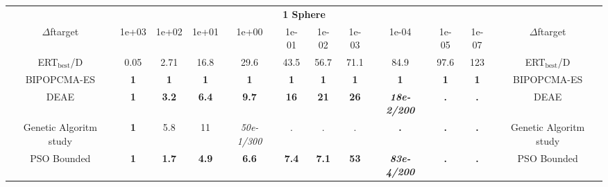 \begin{tabular}{cccccccccccc}
 & \multicolumn{10}{c}{{\normalsize \textbf{1 Sphere}}}\\
$\Delta$ftarget& 1e+03& 1e+02& 1e+01& 1e+00& 1e-01& 1e-02& 1e-03& 1e-04& 1e-05& 1e-07 & $\Delta$ftarget \\
ERT$_{\textrm{best}}$/D& 0.05& 2.71& 16.8& 29.6& 43.5& 56.7& 71.1& 84.9& 97.6& 123 & ERT$_{\textrm{best}}$/D \\
\hline
BIPOPCMA-ES & \textbf{1} & \textbf{1} & \textbf{1} & \textbf{1} & \textbf{1} & \textbf{1} & \textbf{1} & \textbf{1} & \textbf{1} & \textbf{1} & BIPOPCMA-ES \cite{add_an_entry_for_BIPOPCMA-ES_in_bbob.bib}\\
DEAE & \textbf{1} & \textbf{3.2} & \textbf{6.4} & \textbf{9.7} & \textbf{16} & \textbf{21} & \textbf{26} & \textbf{\textit{18e-2}\textit{/200}} & \textbf{.} & \textbf{.} & DEAE \cite{add_an_entry_for_DEAE_in_bbob.bib}\\
Genetic Algoritm study & \textbf{1} & 5.8 & 11 & \textit{50e-1}\textit{/300} & . & . & . & \textbf{.} & \textbf{.} & \textbf{.} & Genetic Algoritm study \cite{add_an_entry_for_Genetic Algoritm study_in_bbob.bib}\\
PSO Bounded & \textbf{1} & \textbf{1.7} & \textbf{4.9} & \textbf{6.6} & \textbf{7.4} & \textbf{7.1} & \textbf{53} & \textbf{\textit{83e-4}\textit{/200}} & \textbf{.} & \textbf{.} & PSO Bounded \cite{add_an_entry_for_PSO Bounded_in_bbob.bib}
\end{tabular}

